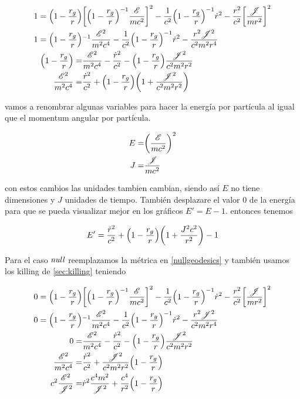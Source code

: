\documentclass[../Main.tex]{subfiles}
\begin{document}
\begin{align}
    1 = \qty(1-\dfrac{r_{g}}{r}) & \qty[\qty(1-\dfrac{r_{g}}{r})^{-1}\dfrac{\mathscr{E}}{mc^{2}}]^{2} - \dfrac{1}{c^{2}}\qty(1-\dfrac{r_{g}}{r})^{-1}\dot{r}^{2} - \dfrac{r^{2}}{c^{2}}\qty[\dfrac{\mathscr{J}}{mr^{2}}]^{2} \\
    1 = \qty(1-\dfrac{r_{g}}{r}) & ^{-1} \dfrac{\mathscr{E}^{2}}{m^{2}c^{4}} - \dfrac{1}{c^{2}}\qty(1-\dfrac{r_{g}}{r})^{-1}\dot{r}^{2} - \dfrac{r^{2}\mathscr{J}^{2}}{c^{2}m^{2}r^{4}} \\
    \qty(1-\dfrac{r_{g}}{r}) = & \dfrac{\mathscr{E}^{2}}{m^{2}c^{4}} - \dfrac{\dot{r}^{2}}{c^{2}} - \qty(1-\dfrac{r_{g}}{r})\dfrac{\mathscr{J}^{2}}{c^{2}m^{2}r^{2}} \\ 
    \dfrac{\mathscr{E}^{2}}{m^{2}c^{4}} = & \dfrac{\dot{r}^{2}}{c^{2}} + \qty(1-\dfrac{r_{g}}{r})\qty(1 + \dfrac{\mathscr{J}^{2}}{c^{2}m^{2}r^{2}})
\end{align}

vamos a renombrar algunas variables para hacer la energía por partícula al igual que el momentum angular por partícula.

\begin{align}
    E = & \qty(\dfrac{\mathscr{E}}{mc^{2}})^{2} \\
    J = & \dfrac{\mathscr{J}}{mc^{2}}
\end{align}

con estos cambios las unidades tambien cambian, siendo así $E$ no tiene dimensiones y $J$ unidades de tiempo. También desplazare el valor 0 de la energía para que se pueda visualizar mejor en los gráficos $E'=E-1$.
entonces tenemos 

\begin{equation}
    E' = \dfrac{\dot{r}^{2}}{c^{2}} + \qty(1-\dfrac{r_{g}}{r})\qty(1 + \dfrac{J^{2}c^{2}}{r^{2}})-1
    \label{SchwarzschildEnergia}
\end{equation}

Para el caso $\textit{null}$ reemplazamos la métrica en \eqref{nullgeodesics} y también usamos los killing de \ref{sec:killing} teniendo

\begin{align}
    0 = \qty(1-\dfrac{r_{g}}{r}) & \qty[\qty(1-\dfrac{r_{g}}{r})^{-1}\dfrac{\mathscr{E}}{mc^{2}}]^{2} - \dfrac{1}{c^{2}}\qty(1-\dfrac{r_{g}}{r})^{-1}\dot{r}^{2} - \dfrac{r^{2}}{c^{2}}\qty[\dfrac{\mathscr{J}}{mr^{2}}]^{2} \\
    0 = \qty(1-\dfrac{r_{g}}{r}) & ^{-1} \dfrac{\mathscr{E}^{2}}{m^{2}c^{4}} - \dfrac{1}{c^{2}}\qty(1-\dfrac{r_{g}}{r})^{-1}\dot{r}^{2} - \dfrac{r^{2}\mathscr{J}^{2}}{c^{2}m^{2}r^{4}} \\
    0 = & \dfrac{\mathscr{E}^{2}}{m^{2}c^{4}} - \dfrac{\dot{r}^{2}}{c^{2}} - \qty(1-\dfrac{r_{g}}{r})\dfrac{\mathscr{J}^{2}}{c^{2}m^{2}r^{2}} \\ 
    \dfrac{\mathscr{E}^{2}}{m^{2}c^{4}} = & \dfrac{\dot{r}^{2}}{c^{2}} + \dfrac{\mathscr{J}^{2}}{c^{2}m^{2}r^{2}}\qty(1-\dfrac{r_{g}}{r}) \\
    c^{2}\dfrac{\mathscr{E}^{2}}{\mathscr{J}^{2}}= & \dot{r}^{2}\dfrac{c^{4}m^{2}}{\mathscr{J}^{2}} + \dfrac{c^{4}}{r^{2}}\qty(1-\dfrac{r_{g}}{r})
\end{align}
\end{document}
